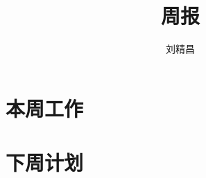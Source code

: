 \documentclass{article}
\begin{document}
\title{周报}
\author{刘精昌}
\maketitle

\section*{本周工作}


\section*{下周计划}
\begin{itemize}

\end{itemize}
\end{document}
